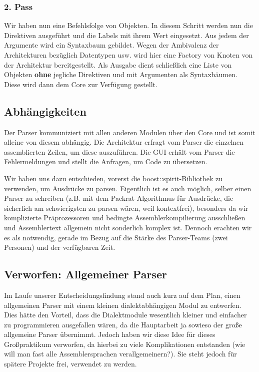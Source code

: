 \documentclass[a4paper]{article}
\begin{document}
\subsubsection{2. Pass}
Wir haben nun eine Befehlsfolge von Objekten. In diesem Schritt werden nun die Direktiven ausgeführt und die Labels mit ihrem Wert eingesetzt.
Aus jedem der Argumente wird ein Syntaxbaum gebildet. Wegen der Ambivalenz der Architekturen bezüglich Datentypen usw. wird hier eine Factory von Knoten von der Architektur bereitgestellt.
Als Ausgabe dient schließlich eine Liste von Objekten \textbf{ohne} jegliche Direktiven und mit Argumenten als Syntaxbäumen. Diese wird dann dem Core zur Verfügung gestellt.
\subsection{Abhängigkeiten}
Der Parser kommuniziert mit allen anderen Modulen über den Core und ist somit alleine von diesem abhängig. 
Die Architektur erfragt vom Parser die einzelnen assemblierten Zeilen, um diese auszuführen.
Die GUI erhält vom Parser die Fehlermeldungen und stellt die Anfragen, um Code zu übersetzen.

Wir haben uns dazu entschieden, vorerst die boost::spirit-Bibliothek zu verwenden, um Ausdrücke zu parsen.
Eigentlich ist es auch möglich, selber einen Parser zu schreiben (z.B. mit dem Packrat-Algorithmus für Ausdrücke, die sicherlich am schwierigsten zu parsen wären, weil kontextfrei),
besonders da wir komplizierte Präprozessoren und bedingte Assemblerkompilierung ausschließen und Assemblertext allgemein nicht sonderlich komplex ist.
Dennoch erachten wir es als notwendig, gerade im Bezug auf die Stärke des Parser-Teams (zwei Personen) und der verfügbaren Zeit.
\subsection{Verworfen: Allgemeiner Parser}
Im Laufe unserer Entscheidungsfindung stand auch kurz auf dem Plan, einen allgemeinen Parser mit einem kleinen dialektabhängigen Modul zu entwerfen.
Dies hätte den Vorteil, dass die Dialektmodule wesentlich kleiner und einfacher zu programmieren ausgefallen wären, da die Hauptarbeit ja sowieso der große allgemeine Parser übernimmt.
Jedoch haben wir diese Idee für dieses Großpraktikum verworfen, da hierbei zu viele Komplikationen entstanden (wie will man fast alle Assemblersprachen verallgemeinern?).
Sie steht jedoch für spätere Projekte frei, verwendet zu werden.
\end{document}
